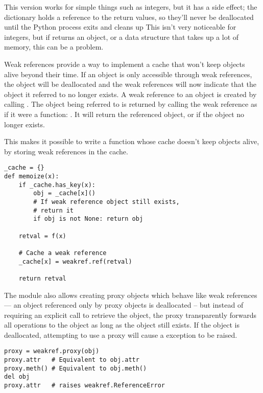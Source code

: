 \documentclass{howto}
\begin{document}
This version works for simple things such as integers, but it has a
side effect; the  dictionary holds a reference to the
return values, so they'll never be deallocated until the Python
process exits and cleans up This isn't very noticeable for integers,
but if  returns an object, or a data structure that
takes up a lot of memory, this can be a problem.

Weak references provide a way to implement a cache that won't keep
objects alive beyond their time.  If an object is only accessible
through weak references, the object will be deallocated and the weak
references will now indicate that the object it referred to no longer
exists.  A weak reference to an object  is created by calling
.  The object being referred to is
returned by calling the weak reference as if it were a function:
.  It will return the referenced object, or  if
the object no longer exists. 

This makes it possible to write a  function whose
cache doesn't keep objects alive, by storing weak references in the
cache.

\begin{verbatim}
_cache = {}
def memoize(x):
    if _cache.has_key(x):
        obj = _cache[x]()
        # If weak reference object still exists,
        # return it
        if obj is not None: return obj
 
    retval = f(x)

    # Cache a weak reference
    _cache[x] = weakref.ref(retval)

    return retval
\end{verbatim}

The  module also allows creating proxy objects which
behave like weak references --- an object referenced only by proxy
objects is deallocated -- but instead of requiring an explicit call to
retrieve the object, the proxy transparently forwards all operations
to the object as long as the object still exists.  If the object is
deallocated, attempting to use a proxy will cause a
 exception to be raised.

\begin{verbatim}
proxy = weakref.proxy(obj)
proxy.attr   # Equivalent to obj.attr
proxy.meth() # Equivalent to obj.meth()
del obj
proxy.attr   # raises weakref.ReferenceError
\end{verbatim}
\end{document}
